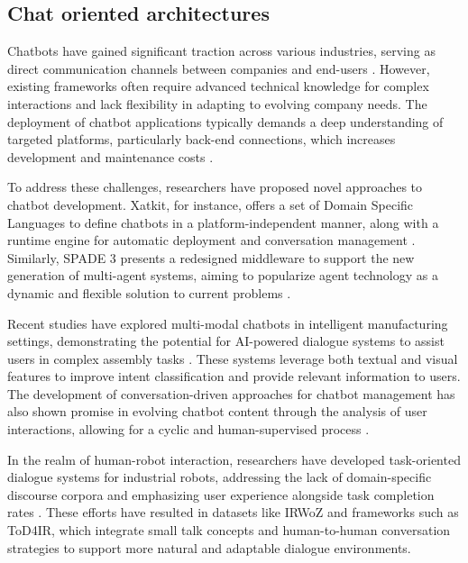 \documentclass{ieeeaccess}
\begin{document}
\subsection{Chat oriented architectures}

Chatbots have gained significant traction across various industries, serving as direct communication channels between companies and end-users \cite{8960373}. However, existing frameworks often require advanced technical knowledge for complex interactions and lack flexibility in adapting to evolving company needs. The deployment of chatbot applications typically demands a deep understanding of targeted platforms, particularly back-end connections, which increases development and maintenance costs \cite{8960373}.

To address these challenges, researchers have proposed novel approaches to chatbot development. Xatkit, for instance, offers a set of Domain Specific Languages to define chatbots in a platform-independent manner, along with a runtime engine for automatic deployment and conversation management \cite{8960373}. Similarly, SPADE 3 presents a redesigned middleware to support the new generation of multi-agent systems, aiming to popularize agent technology as a dynamic and flexible solution to current problems \cite{9207929}.

Recent studies have explored multi-modal chatbots in intelligent manufacturing settings, demonstrating the potential for AI-powered dialogue systems to assist users in complex assembly tasks \cite{9440470}. These systems leverage both textual and visual features to improve intent classification and provide relevant information to users. The development of conversation-driven approaches for chatbot management has also shown promise in evolving chatbot content through the analysis of user interactions, allowing for a cyclic and human-supervised process \cite{9681834}.

In the realm of human-robot interaction, researchers have developed task-oriented dialogue systems for industrial robots, addressing the lack of domain-specific discourse corpora and emphasizing user experience alongside task completion rates \cite{9869659}. These efforts have resulted in datasets like IRWoZ and frameworks such as ToD4IR, which integrate small talk concepts and human-to-human conversation strategies to support more natural and adaptable dialogue environments.
\end{document}
